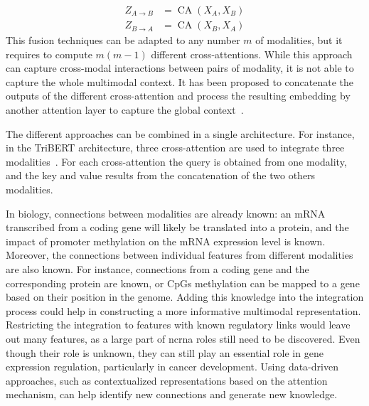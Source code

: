 \documentclass[../main.tex]{subfiles}
\begin{document}
\begin{description}[%
			style=multiline,
			leftmargin=!,
			labelwidth=3cm,
		]
			\setlength{\belowdisplayshortskip}{0pt}
			\begin{align*}
				Z_{A \rightarrow B} & = \operatorname{CA}\left(X_A, X_B \right) \\
				Z_{B \rightarrow A} & = \operatorname{CA}\left(X_B, X_A \right)
			\end{align*} %
			\endgroup
			This fusion techniques can be adapted to any number \(m\) of modalities, but it requires to compute \(m\left(m-1\right)\) different cross-attentions.
			While this approach can capture cross-modal interactions between pairs of modality, it is not able to capture the whole multimodal context.
			It has been proposed to concatenate the outputs of the different cross-attention and process the resulting embedding by another attention layer to capture the global context~\cite{tsai-etal-2019-multimodal}.
	\end{description}
	The different approaches can be combined in a single architecture.
	For instance, in the TriBERT architecture, three cross-attention are used to integrate three modalities~\cite{TriBERT}.
	For each cross-attention the query is obtained from one modality, and the key and value results from the concatenation of the two others modalities.

	In biology, connections between modalities are already known: an mRNA transcribed from a coding gene will likely be translated into a protein, and the impact of promoter methylation on the mRNA expression level is known.
	Moreover, the connections between individual features from different modalities are also known.
	For instance, connections from a coding gene and the corresponding protein are known, or CpGs methylation can be mapped to a gene based on their position in the genome.
	Adding this knowledge into the integration process could help in constructing a more informative multimodal representation.
	Restricting the integration to features with known regulatory links would leave out many features, as a large part of \gls{ncrna} roles still need to be discovered.
	Even though their role is unknown, they can still play an essential role in gene expression regulation, particularly in cancer development.
	Using data-driven approaches, such as contextualized representations based on the attention mechanism, can help identify new connections and generate new knowledge.
\end{document}

